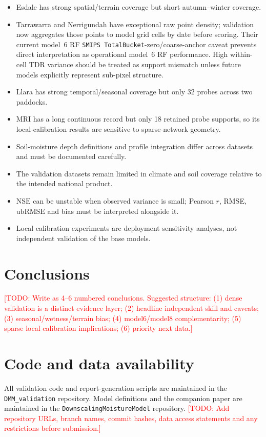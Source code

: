 \documentclass[11pt,a4paper]{article}
\newcommand{\nse}{\ensuremath{\mathrm{NSE}}}
\newcommand{\ubrmse}{\ensuremath{\mathrm{ubRMSE}}}
\newcommand{\pearsonr}{\ensuremath{r}}
\newcommand{\modelSix}{model~6 RF}
\newcommand{\smips}{\texttt{SMIPS TotalBucket}}
\newcommand{\todo}[1]{\textcolor{red}{[TODO: #1]}}
\begin{document}
\begin{itemize}
\item Esdale has strong spatial/terrain coverage but short autumn--winter
coverage.
\item Tarrawarra and Nerrigundah have exceptional raw point density; validation
now aggregates those points to model grid cells by date before scoring. Their
current \modelSix{} \smips{}-zero/coarse-anchor caveat prevents direct
interpretation as operational \modelSix{} performance. High within-cell TDR
variance should be treated as support mismatch unless future models explicitly
represent sub-pixel structure.
\item Llara has strong temporal/seasonal coverage but only 32 probes across
two paddocks.
\item MRI has a long continuous record but only 18 retained probe supports, so
its local-calibration results are sensitive to sparse-network geometry.
\item Soil-moisture depth definitions and profile integration differ across
datasets and must be documented carefully.
\item The validation datasets remain limited in climate and soil coverage
relative to the intended national product.
\item \nse{} can be unstable when observed variance is small; Pearson
$\pearsonr$, RMSE, \ubrmse{} and bias must be interpreted alongside it.
\item Local calibration experiments are deployment sensitivity analyses, not
independent validation of the base models.
\end{itemize}

\section{Conclusions}\label{sec:conclusions}

\todo{Write as 4--6 numbered conclusions.  Suggested structure:
(1) dense validation is a distinct evidence layer; (2) headline independent
skill and caveats; (3) seasonal/wetness/terrain bias; (4) model6/model8
complementarity; (5) sparse local calibration implications; (6) priority next
data.}

\section*{Code and data availability}

All validation code and report-generation scripts are maintained in the
\texttt{DMM\_validation} repository.  Model definitions and the companion paper
are maintained in the \texttt{DownscalingMoistureModel} repository.
\todo{Add repository URLs, branch names, commit hashes, data access statements
and any restrictions before submission.}
\end{document}
